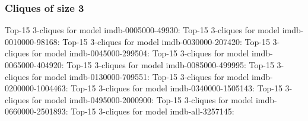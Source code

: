 \documentclass[a4paper,11pt]{article}
\newcommand{\p}[1]{\textsf{\small #1}}
\newcommand{\qr}[3]{\noindent{}Top-15 #2 for #3:{\scriptsize}}
\begin{document}
\newpage
\subsubsection{Cliques of size 3}

\qr{imdb-0005000-49930.movies.bin.query.triples}{3-cliques}{model \p{imdb-0005000-49930}}
\qr{imdb-0010000-98168.movies.bin.query.triples}{3-cliques}{model \p{imdb-0010000-98168}}
\qr{imdb-0030000-207420.movies.bin.query.triples}{3-cliques}{model \p{imdb-0030000-207420}}
\qr{imdb-0045000-299504.movies.bin.query.triples}{3-cliques}{model \p{imdb-0045000-299504}}
\qr{imdb-0065000-404920.movies.bin.query.triples}{3-cliques}{model \p{imdb-0065000-404920}}
\qr{imdb-0085000-499995.movies.bin.query.triples}{3-cliques}{model \p{imdb-0085000-499995}}
\qr{imdb-0130000-709551.movies.bin.query.triples}{3-cliques}{model \p{imdb-0130000-709551}}
\qr{imdb-0200000-1004463.movies.bin.query.triples}{3-cliques}{model \p{imdb-0200000-1004463}}
\qr{imdb-0340000-1505143.movies.bin.query.triples}{3-cliques}{model \p{imdb-0340000-1505143}}
\qr{imdb-0495000-2000900.movies.bin.query.triples}{3-cliques}{model \p{imdb-0495000-2000900}}
\qr{imdb-0660000-2501893.movies.bin.query.triples}{3-cliques}{model \p{imdb-0660000-2501893}}
\qr{imdb-all-3257145.movies.bin.query.triples}{3-cliques}{model \p{imdb-all-3257145}}
\end{document}
